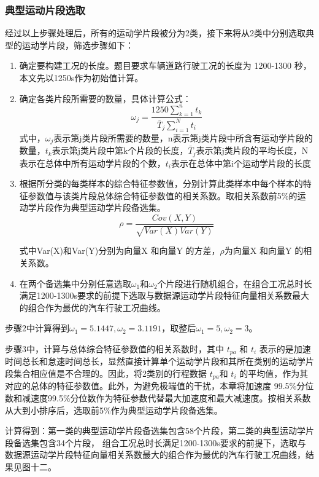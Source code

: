 \documentclass[bwprint]{gmcmthesis}
\begin{document}
\subsubsection{典型运动片段选取}

经过以上步骤处理后，所有的运动学片段被分为2类，接下来将从2类中分别选取典型的运动学片段，筛选步骤如下：
\begin{enumerate}
\item 确定要构建工况的长度。题目要求车辆道路行驶工况的长度为 1200-1300 秒，本文先以1250s作为初始值计算。
\item 确定各类片段所需要的数量，具体计算公式：
\begin{equation}
\omega_j=\frac{1250\sum\limits^n_{k=1}t_k}{\bar T_j\sum\limits^N_{i=1}t_i}
\end{equation}
式中，$\omega_j$表示第j类片段所需要的数量，n表示第j类片段中所含有运动学片段的数量，$t_k$表示第j类片段中第k个片段的长度，$\bar T_j$表示第j类片段的平均长度，N表示在总体中所有运动学片段的个数，$t_i$表示在总体中第i个运动学片段的长度
\item 根据所分类的每类样本的综合特征参数值，分别计算此类样本中每个样本的特征参数值与该类片段总体综合特征参数值的相关系数。取相关系数前5\%的运动学片段作为典型运动学片段备选集。
\begin{equation}
\rho=\frac{Cov(X,Y)}{\sqrt{Var(X)Var(Y)}}
\end{equation}

式中Var(X)和Var(Y)分别为向量X 和向量Y 的方差，$\rho$为向量X 和向量Y 的相关系数。

\item 	在两个备选集中分别任意选取$\omega_1$和$\omega_2$个片段进行随机组合，在组合工况总时长满足1200-1300s要求的前提下选取与数据源运动学片段特征向量相关系数最大的组合作为最优的汽车行驶工况曲线。
\end{enumerate}


步骤2中计算得到$\omega_1=5.1447,\omega_2=3.1191$，取整后$\omega_1=5,\omega_2=3$。

步骤3中，计算与总体综合特征参数值的相关系数时，其中 $t_{pa}$ 和 $t_i$ 表示的是加速时间总长和怠速时间总长，显然直接计算单个运动学片段和其所在类别的运动学片段集合相应值是不合理的。因此，将2类别的行程数据 $t_{pa}$和 $t_i$ 的平均值，作为其对应的总体的特征参数值。此外，为避免极端值的干扰，本章将加速度 99.5\%分位数和减速度99.5\%分位数作为特征参数代替最大加速度和最大减速度。按相关系数从大到小排序后，选取前5\%作为典型运动学片段备选集。

计算得到：第一类的典型运动学片段备选集包含58个片段，第二类的典型运动学片段备选集包含34个片段， 组合工况总时长满足1200-1300s要求的前提下，选取与数据源运动学片段特征向量相关系数最大的组合作为最优的汽车行驶工况曲线，结果见图十二。
\end{document}
